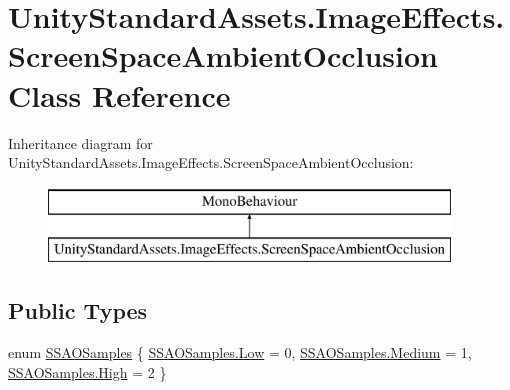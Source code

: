\hypertarget{class_unity_standard_assets_1_1_image_effects_1_1_screen_space_ambient_occlusion}{}\section{Unity\+Standard\+Assets.\+Image\+Effects.\+Screen\+Space\+Ambient\+Occlusion Class Reference}
\label{class_unity_standard_assets_1_1_image_effects_1_1_screen_space_ambient_occlusion}
Inheritance diagram for Unity\+Standard\+Assets.\+Image\+Effects.\+Screen\+Space\+Ambient\+Occlusion\+:\begin{figure}[H]
\begin{center}
\leavevmode
\includegraphics[height=2.000000cm]{class_unity_standard_assets_1_1_image_effects_1_1_screen_space_ambient_occlusion}
\end{center}
\end{figure}
\subsection*{Public Types}
\begin{DoxyCompactItemize}
\item 
enum \mbox{\hyperlink{class_unity_standard_assets_1_1_image_effects_1_1_screen_space_ambient_occlusion_ad3f9892497dd8bf8570c4e61584f3df0}{S\+S\+A\+O\+Samples}} \{ \mbox{\hyperlink{class_unity_standard_assets_1_1_image_effects_1_1_screen_space_ambient_occlusion_ad3f9892497dd8bf8570c4e61584f3df0a28d0edd045e05cf5af64e35ae0c4c6ef}{S\+S\+A\+O\+Samples.\+Low}} = 0, 
\mbox{\hyperlink{class_unity_standard_assets_1_1_image_effects_1_1_screen_space_ambient_occlusion_ad3f9892497dd8bf8570c4e61584f3df0a87f8a6ab85c9ced3702b4ea641ad4bb5}{S\+S\+A\+O\+Samples.\+Medium}} = 1, 
\mbox{\hyperlink{class_unity_standard_assets_1_1_image_effects_1_1_screen_space_ambient_occlusion_ad3f9892497dd8bf8570c4e61584f3df0a655d20c1ca69519ca647684edbb2db35}{S\+S\+A\+O\+Samples.\+High}} = 2
 \}
\end{DoxyCompactItemize}
